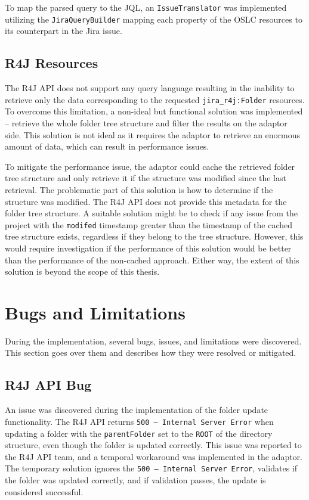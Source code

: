 To map the parsed query to the JQL, an \texttt{IssueTranslator} was implemented utilizing the \texttt{JiraQueryBuilder} mapping each property of the OSLC resources to its counterpart in the Jira issue.

\subsection*{R4J Resources}
\label{sec:r4j_query}
The R4J API does not support any query language resulting in the inability to retrieve only the data corresponding to the requested \texttt{jira\_r4j:Folder} resources. To overcome this limitation, a non-ideal but functional solution was implemented -- retrieve the whole folder tree structure and filter the results on the adaptor side. This solution is not ideal as it requires the adaptor to retrieve an enormous amount of data, which can result in performance issues.

To mitigate the performance issue, the adaptor could cache the retrieved folder tree structure and only retrieve it if the structure was modified since the last retrieval. The problematic part of this solution is how to determine if the structure was modified. The R4J API does not provide this metadata for the folder tree structure. A suitable solution might be to check if any issue from the project with the \texttt{modifed} timestamp greater than the timestamp of the cached tree structure exists, regardless if they belong to the tree structure. However, this would require investigation if the performance of this solution would be better than the performance of the non-cached approach. Either way, the extent of this solution is beyond the scope of this thesis.

\section{Bugs and Limitations}
During the implementation, several bugs, issues, and limitations were discovered. This section goes over them and describes how they were resolved or mitigated.

\subsection*{R4J API Bug}
An issue was discovered during the implementation of the folder update functionality. The R4J API returns \texttt{500 -- Internal Server Error} when updating a folder with the \texttt{parentFolder} set to the \texttt{ROOT} of the directory structure, even though the folder is updated correctly. This issue was reported to the R4J API team, and a temporal workaround was implemented in the adaptor. The temporary solution ignores the \texttt{500 -- Internal Server Error}, validates if the folder was updated correctly, and if validation passes, the update is considered successful.

